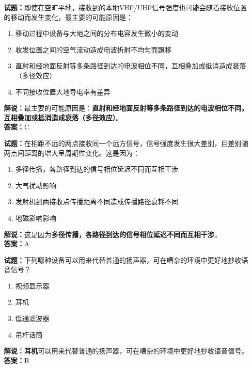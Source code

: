 \documentclass{ctexbook}
\begin{document}
\vspace{1em}

\textbf{试题：}即使在空旷平地，接收到的本地VHF/UHF信号强度也可能会随着接收位置的移动而发生变化，最主要的可能原因是：
\begin{enumerate}[leftmargin=3em]
  \item 移动过程中设备与大地之间的分布电容发生微小的变动
  \item 收发位置之间的空气流动造成电波折射不均匀而飘移
  \item 直射和经地面反射等多条路径到达的电波相位不同，互相叠加或抵消造成衰落（多径效应）
  \item 不同接收位置大地导电率有差异
\end{enumerate}
\noindent\textbf{解说：}最主要的可能原因是：\textbf{直射和经地面反射等多条路径到达的电波相位不同，互相叠加或抵消造成衰落（多径效应）}。\\\noindent\textbf{答案：}C

\vspace{1em}

\textbf{试题：}在相距不远的两点接收同一个远方信号，信号强度发生很大差别，且差别随两点间距离的增大呈周期性变化。这是因为：
\begin{enumerate}[leftmargin=3em]
  \item 多径传播，各路径到达的信号相位延迟不同而互相干涉
  \item 大气扰动影响
  \item 发射机到两接收点传播距离不同造成传播路径衰耗不同
  \item 地磁影响影响
\end{enumerate}
\noindent\textbf{解说：}这是因为\textbf{多径传播，各路径到达的信号相位延迟不同而互相干涉}。\\\noindent\textbf{答案：}A

\vspace{1em}

\textbf{试题：}下列哪种设备可以用来代替普通的扬声器，可在嘈杂的环境中更好地抄收语音信号？
\begin{enumerate}[leftmargin=3em]
  \item 视频显示器
  \item 耳机
  \item 低通滤波器
  \item 吊杆话筒
\end{enumerate}
\noindent\textbf{解说：耳机}可以用来代替普通的扬声器，可在嘈杂的环境中更好地抄收语音信号。\\\noindent\textbf{答案：}B

\vspace{1em}
\end{document}

